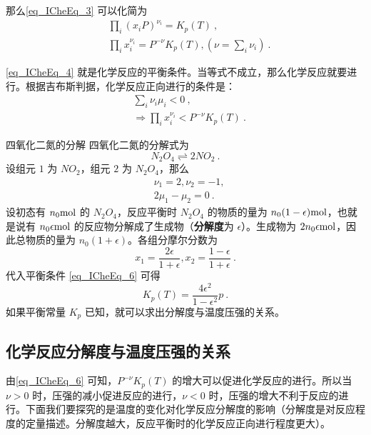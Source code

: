 那么\autoref{eq_ICheEq_3} 可以化简为
\begin{equation}\label{eq_ICheEq_4}
\begin{aligned}
&\prod_i (x_iP)^{\nu_i}=K_p(T)~,\\
&\prod_i x_i^{\nu_i}=P^{-\nu} K_p(T),(\nu=\sum_i\nu_i)~.
\end{aligned}
\end{equation}

\autoref{eq_ICheEq_4} 就是化学反应的平衡条件。当等式不成立，那么化学反应就要进行。根据吉布斯判据，化学反应正向进行的条件是：
\begin{equation}\label{eq_ICheEq_6}
\begin{aligned}
&\sum_i \nu_i\mu_i<0~,\\
&\Rightarrow \prod_i x_i^{\nu_i}<P^{-\nu}K_p(T)~.
\end{aligned}
\end{equation}

\begin{example}{四氧化二氮的分解}\label{ex_ICheEq_1}
四氧化二氮的分解式为
\begin{equation}
N_2O_4\rightleftharpoons 2NO_2~.
\end{equation}
设组元 $1$ 为 $NO_2$，组元 $2$ 为 $N_2O_4$，那么
\begin{equation}
\begin{aligned}
&\nu_1=2,\nu_2=-1,\\
&2\mu_1-\mu_2=0~.
\end{aligned}
\end{equation}
设初态有 $n_0 \rm{mol}$ 的 $N_2O_4$，反应平衡时 $N_2O_4$ 的物质的量为 $n_0(1-\epsilon) \rm{mol}$，也就是说有 $n_0 \epsilon \rm{mol}$ 的反应物分解成了生成物（\textbf{分解度}为 $\epsilon$）。生成物为 $2n_0\epsilon \rm{mol}$，因此总物质的量为 $n_0(1+\epsilon)$。各组分摩尔分数为
\begin{equation}
x_1=\frac{2\epsilon}{1+\epsilon},x_2=\frac{1-\epsilon}{1+\epsilon}~.
\end{equation}
代入平衡条件 \autoref{eq_ICheEq_6} 可得
\begin{equation}
K_p(T)=\frac{4\epsilon^2}{1-\epsilon^2}p~.
\end{equation}
如果平衡常量 $K_p$ 已知，就可以求出分解度与温度压强的关系。
\end{example}


\subsection{化学反应分解度与温度压强的关系}
由\autoref{eq_ICheEq_6} 可知，$P^{-\nu}K_p(T)$ 的增大可以促进化学反应的进行。所以当 $\nu>0$ 时，压强的减小促进反应的进行，$\nu<0$ 时，压强的增大不利于反应的进行。下面我们要探究的是温度的变化对化学反应分解度的影响（分解度是对反应程度的定量描述。分解度越大，反应平衡时的化学反应正向进行程度更大）。

